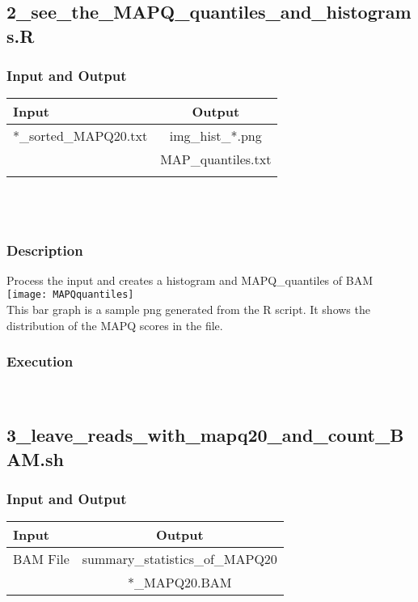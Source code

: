 \documentclass[14pt]{article}
\begin{document}
\subsection{2\_see\_the\_MAPQ\_quantiles\_and\_histograms.R}
\subsubsection{Input and Output}
\begin{tabular}{l |c }

Input & Output \\
\hline
*\_sorted\_MAPQ20.txt & img\_hist\_*.png\\
& MAP\_quantiles.txt\\
\\
\end{tabular}\\
\\
\subsubsection{Description}
Process the input and creates a histogram and MAPQ\_quantiles of BAM\\
\texttt{[image: MAPQquantiles]}
\\
This bar graph is a sample png generated from the R script. It shows the distribution of the MAPQ scores in the file.
\\
\subsubsection{Execution}
\\

\subsection{3\_leave\_reads\_with\_mapq20\_and\_count\_BAM.sh}
\subsubsection{Input and Output}
\begin{tabular}{l |c }

Input & Output \\
\hline
BAM File & summary\_statistics\_of\_MAPQ20\\
&*\_MAPQ20.BAM\\
\end{tabular}\\
\\
\end{document}
